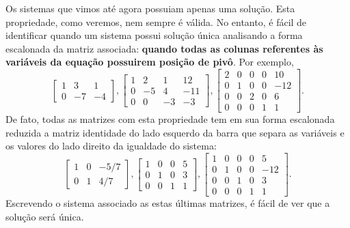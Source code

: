Os sistemas que vimos até agora possuiam apenas uma solução. Esta propriedade, como veremos, nem sempre é válida. No entanto, é fácil de identificar quando um sistema possui solução única analisando a forma escalonada da matriz associada: \textbf{quando todas as colunas referentes às variáveis da equação possuirem posição de pivô}. Por exemplo,
\begin{equation}
\left[
 \begin{array}{cc|c}
  1 & 3 & 1 \\
  0 & -7 & -4
 \end{array}
\right],
\left[
  \begin{array}{ccc|c}
    1 &  2 &  1 &  12 \\
    0 & -5 &  4 & -11 \\
    0 &  0 & -3 & -3
  \end{array}
\right],
 \left[
  \begin{array}{cccc|c}
    2 &  0 &  0 & 0 & 10 \\
    0 &  1 &  0 & 0 & -12 \\
    0 &  0 &  2 & 0 & 6 \\
    0 &  0 &  0 & 1 & 1
  \end{array}
\right].
\end{equation} De fato, todas as matrizes com esta propriedade tem em sua forma escalonada reduzida a matriz identidade do lado esquerdo da barra que separa as variáveis e os valores do lado direito da igualdade do sistema:
\begin{equation}
\left[
 \begin{array}{cc|c}
  1 & 0 & -5/7 \\
  0 & 1 &  4/7
 \end{array}
\right],
\left[
  \begin{array}{ccc|c}
    1 &  0 &  0   &  5 \\
    0 &  1 &  0   &  3 \\
    0 &  0 &  1   &  1
  \end{array}
\right],
 \left[
  \begin{array}{cccc|c}
    1 &  0 &  0 & 0 & 5 \\
    0 &  1 &  0 & 0 & -12 \\
    0 &  0 &  1 & 0 & 3 \\
    0 &  0 &  0 & 1 & 1
  \end{array}
\right].
\end{equation} Escrevendo o sistema associado as estas últimas matrizes, é fácil de ver que a solução será única.


